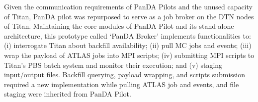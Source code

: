 

Given the communication requirements of PanDA Pilots and the unused capacity of
Titan, PanDA pilot was repurposed to serve as a job broker on the DTN nodes of
Titan. Maintaining the core modules of PanDA Pilot and its stand-alone
architecture, this prototype called `PanDA Broker' implements functionalities
to: (i) interrogate Titan about backfill availability; (ii) pull MC jobs and
events; (iii) wrap the payload of ATLAS jobs into MPI scripts; (iv) submitting
MPI scripts to Titan's PBS batch system and monitor their execution; and (v)
staging input/output files. Backfill querying, payload wrapping, and scripts
submission required a new implementation while pulling ATLAS job and events, and
file staging were inherited from PanDA Pilot.


